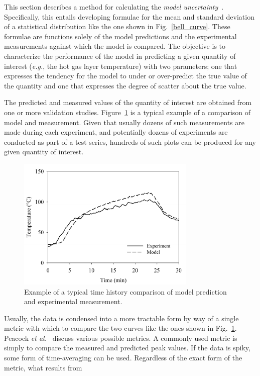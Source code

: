 This section describes a method for calculating the {\em model uncertainty}~\cite{McGrattan:Metrologia}. Specifically, this entails developing formulae for
the mean and standard deviation of a statistical distribution like the one shown in Fig.~\ref{bell_curve}. These formulae are functions
solely of the model predictions and the experimental measurements against which the model is compared. The objective is to
characterize the performance of the model in predicting a given quantity of interest ({\em e.g.}, the hot gas layer temperature) with two
parameters; one that expresses the tendency for the model to under or over-predict the true value of the quantity and one that expresses the degree of scatter
about the true value.

The predicted and measured values of the quantity of interest are obtained from one or more validation studies.
Figure~\ref{temp_history} is a typical example of a comparison of model and measurement. Given that usually
dozens of such measurements are made during each experiment,
and potentially dozens of experiments are conducted as part of a test series, hundreds of such plots can be
produced for any given quantity of interest.
\begin{figure}[ht]
\begin{center}
\includegraphics[height=2.5in]{FIGURES/sample_time_history}
\end{center}
\caption[Sample time history plots.]{Example of a typical time history comparison of model prediction and experimental measurement.}
\label{temp_history}
\end{figure}
Usually, the data is condensed into a more tractable form by way of a single metric with which to
compare the two curves like the ones shown in Fig.~\ref{temp_history}. Peacock {\em et al.}~\cite{Peacock:FSJ1999}
discuss various possible metrics. A commonly used metric is simply to compare the measured and predicted peak values.
If the data is spiky, some form of time-averaging can be used. Regardless of the exact form of the metric, what results from
